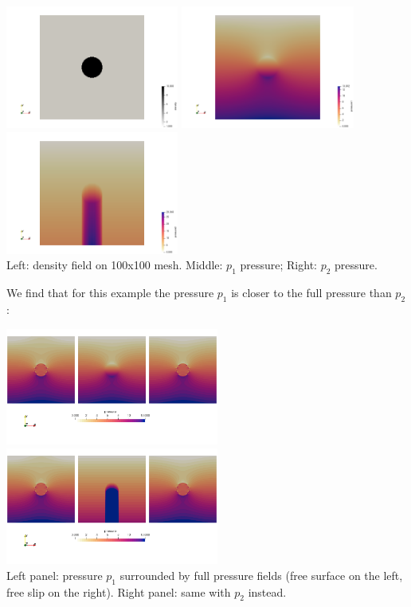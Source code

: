 \begin{center}
\includegraphics[width=5.7cm]{python_codes/fieldstone_119/results/exp5/rho}
\includegraphics[width=5.7cm]{python_codes/fieldstone_119/results/exp5/p1}
\includegraphics[width=5.7cm]{python_codes/fieldstone_119/results/exp5/p2}\\
{\captionfont Left: density field on 100x100 mesh. Middle: $p_1$ pressure; Right: $p_2$ pressure.} 
\end{center}

We find that for this example the pressure $p_1$ is closer to the full pressure than $p_2$:
\begin{center}
\includegraphics[width=7cm]{python_codes/fieldstone_119/results/exp5/comp1}
\hspace{0.5cm}
\includegraphics[width=7cm]{python_codes/fieldstone_119/results/exp5/comp2}\\
{\captionfont Left panel: pressure $p_1$ surrounded by full pressure fields (free surface
on the left, free slip on the right). Right panel: same with $p_2$ instead.}
\end{center}

